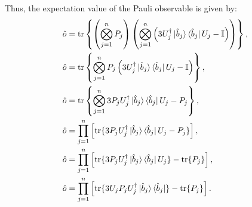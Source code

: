 \documentclass[12pt]{article}
\begin{document}
    Thus, the expectation value of the Pauli observable is given by:
    \begin{align*}
        \hat{o} &= \text{tr}\left\{\left( \bigotimes_{j=1}^n P_j \right) \left( \bigotimes^n_{j=1}\left(3U_j^\dagger\ket{\hat{b}_j}\bra{\hat{b}_j}U_j - \mathbb{I} \right) \right)\right\},\\
        \hat{o} &= \text{tr}\left\{ \bigotimes_{j=1}^n P_j  \left(3U_j^\dagger\ket{\hat{b}_j}\bra{\hat{b}_j}U_j - \mathbb{I} \right) \right\},\\
        \hat{o} &= \text{tr}\left\{ \bigotimes_{j=1}^n 3P_jU_j^\dagger\ket{\hat{b}_j}\bra{\hat{b}_j}U_j - P_j  \right\},\\
        \hat{o} &= \prod_{j=1}^n \left[ \text{tr}\{ 3 P_j U^\dagger_j \ket{\hat{b}_j}\bra{\hat{b}_j}U_j -  P_j \} \right],\\
        \hat{o} &= \prod_{j=1}^n \left[ \text{tr}\{ 3 P_j U^\dagger_j \ket{\hat{b}_j}\bra{\hat{b}_j}U_j\} - \text{tr}\{ P_j \} \right],\\
        \hat{o} &= \prod_{j=1}^n \left[ \text{tr}\{ 3 U_jP_j U^\dagger_j \ket{\hat{b}_j}\bra{\hat{b}_j}\} - \text{tr}\{ P_j \} \right].
    \end{align*}


    \printbibliography[title={References}]
\end{document}
